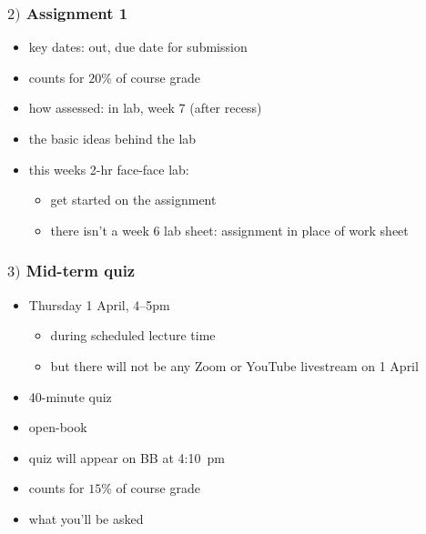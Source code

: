 \documentclass[english,14pt]{beamer}
\begin{document}

\begin{frame}[fragile]

\frametitle{$2)$ Assignment 1}

\begin{itemize}
	\item key dates: out, due date for submission
	\item counts for $20$\% of course grade
	\item how assessed: in lab, week 7 (after recess)
	\item the basic ideas behind the lab
	\item this weeks 2-hr face-face lab:
	\begin{itemize}
		\item get started on the assignment
		\item there isn't a week 6 lab sheet: assignment in place of work sheet
	\end{itemize}
\end{itemize}

\end{frame}


\begin{frame}[fragile]

\frametitle{$3)$ Mid-term quiz}

\begin{itemize}
	\item Thursday 1 April, 4--5pm
	\begin{itemize}
		\item during scheduled lecture time
		\item but there will not be any Zoom or YouTube livestream on 1 April
	\end{itemize}
	\item 40-minute quiz
	\item open-book

	\item quiz will appear on BB at 4:10~pm
	\item counts for $15$\% of course grade
	\item what you'll be asked
\end{itemize}

\end{frame}

\end{document}
